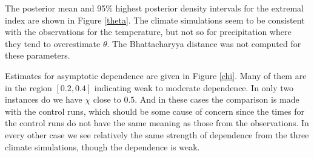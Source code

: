 The posterior mean and 95\% highest posterior density intervals for the extremal index are shown in Figure \ref{theta}. The climate simulations seem to be consistent with the observations for the temperature, but not so for precipitation where they tend to overestimate $\theta$. The Bhattacharyya distance was not computed for these parameters.

Estimates for asymptotic dependence are given in Figure \ref{chi}. Many of them are in the region $[0.2, 0.4]$ indicating weak to moderate dependence. In only two instances do we have $\chi$ close to $0.5$. And in these cases the comparison is made with the control runs, which should be some cause of concern since the times for the control runs do not have the same meaning as those from the observations. In every other case we see relatively the same strength of dependence from the three climate simulations, though the dependence is weak.

